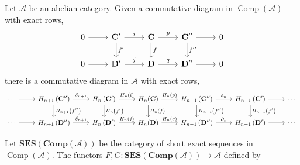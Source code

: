 \documentclass[12pt, oneside]{book}
\begin{document}
\begin{theorem}
    Let $\mathcal{A}$ be an abelian category.
    Given a commutative diagram in $\operatorname{Comp}(\mathcal{A})$ with exact rows,
    \begin{equation*}
        \begin{tikzcd}
            0 \arrow{r} & \mathbf{C}^{\prime} \arrow{r}{i} \arrow{d}{f^{\prime}} & \mathbf{C} \arrow{r}{p} \arrow{d}{f} & \mathbf{C}^{\prime \prime} \arrow{r} \arrow{d}{f^{\prime \prime}} & 0 \\
            0 \arrow{r} & \mathbf{D}^{\prime} \arrow{r}{j}                          & \mathbf{D} \arrow{r}{q}                          & \mathbf{D}^{\prime \prime} \arrow{r}                 & 0
        \end{tikzcd}
    \end{equation*}
    there is a commutative diagram in $\mathcal{A}$ with exact rows,
    \begin{equation*}
        \begin{tikzcd}
            \cdots \arrow{r} & H_{n+1}\left(\mathbf{C}^{\prime \prime}\right) \arrow{r}{\delta_{n+1}} \arrow{d}{H_{n+1}\left(f^{\prime \prime}\right)} & H_n\left(\mathbf{C}^{\prime}\right) \arrow{r}{H_n(i)} \arrow{d}{H_n\left(f^{\prime}\right)} & H_n(\mathbf{C}) \arrow{r}{H_n(p)} \arrow{d}{H_n(f)} & H_{n-1}\left(\mathbf{C}^{\prime \prime}\right) \arrow{r}{\delta_n} \arrow{d}{H_{n-1}\left(f^{\prime \prime}\right)} & H_{n-1}\left(\mathbf{C}^{\prime}\right) \arrow{r} \arrow{d}{H_{n-1}\left(f^{\prime}\right)} & \cdots \\
            \cdots \arrow{r} & H_{n+1}\left(\mathbf{D}^{\prime \prime}\right) \arrow{r}{\delta_{n+1}}                          & H_n\left(\mathbf{D}^{\prime}\right) \arrow{r}{H_n(j)}                          & H_n(\mathbf{D}) \arrow{r}{H_n(q)}                          & H_{n-1}\left(\mathbf{D}^{\prime \prime}\right) \arrow{r}{\partial_n}                          & H_{n-1}\left(\mathbf{D}^{\prime}\right) \arrow{r}                          & \cdots
        \end{tikzcd}
    \end{equation*}
    \begin{remark}
        Let $\mathbf{SES}\left(\mathbf{Comp}\left(\mathcal{A}\right)\right)$ be the category of short exact sequences in $\operatorname{Comp}(\mathcal{A})$.
        The functors $F,G:\mathbf{SES}\left(\mathbf{Comp}\left(\mathcal{A}\right)\right) \rightarrow \mathcal{A}$ defined by
        \begin{equation*}

\end{equation*}
\end{remark}
\end{theorem}
\end{document}
